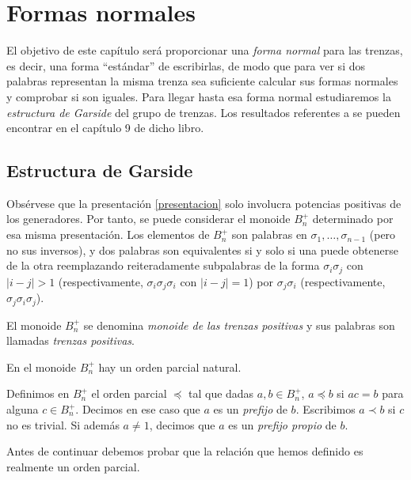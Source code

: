 \documentclass[TFG.tex]{subfiles}
\begin{document}
\chapter{Formas normales}

El objetivo de este capítulo será proporcionar una \emph{forma normal} para las trenzas, es decir, una forma ``estándar'' de escribirlas, de modo que para ver si dos palabras representan la misma trenza sea suficiente calcular sus formas normales y comprobar si son iguales. Para llegar hasta esa forma normal estudiaremos la \emph{estructura de Garside} del grupo de trenzas. Los resultados referentes a \cite{Thurston} se pueden encontrar en el capítulo 9 de dicho libro.

\section{Estructura de Garside}



Obsérvese que la presentación \ref{presentacion} solo involucra potencias positivas de los generadores. Por tanto, se puede considerar el monoide $B_n^+$ determinado por esa misma presentación. Los elementos de $B_n^+$ son palabras en $\sigma_1,\dots,\sigma_{n-1}$ (pero no sus inversos), y dos palabras son equivalentes si y solo si una puede obtenerse de la otra reemplazando reiteradamente subpalabras de la forma $\sigma_i\sigma_j$ con $|i-j|>1$ (respectivamente, $\sigma_i\sigma_j\sigma_i$ con $|i-j|=1$) por $\sigma_j\sigma_i$ (respectivamente, $\sigma_j\sigma_i\sigma_j$).

\begin{defi}
El monoide $B_n^+$ se denomina \emph{monoide de las trenzas positivas} y sus palabras son llamadas \emph{trenzas positivas}.
\end{defi}
En el monoide $B_n^+$ hay un orden parcial natural. 
\begin{defi}
Definimos en $B_n^+$ el orden parcial $\preccurlyeq$ tal que dadas $a,b\in B_n^+$, $a\preccurlyeq b$ si $ac=b$ para alguna $c\in B_n^+$. Decimos en ese caso que $a$ es un \emph{prefijo} de $b$. Escribimos $a\prec b$ si $c$ no es trivial. Si además $a\neq 1$, decimos que $a$ es un \emph{prefijo propio} de $b$. 
\end{defi}

Antes de continuar debemos probar que la relación que hemos definido es realmente un orden parcial.
\end{document}
